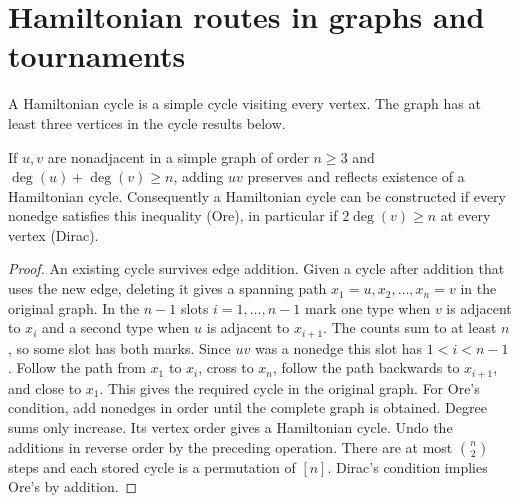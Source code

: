\section{Hamiltonian routes in graphs and tournaments}\label{co:hamilton}
A Hamiltonian cycle is a simple cycle visiting every vertex. The graph
has at least three vertices in the cycle results below.

\begin{theorem}\leavevmode\label{co:ore}
If $u,v$ are nonadjacent in a simple graph of order $n\ge3$ and
$\deg(u)+\deg(v)\ge n$, adding $uv$ preserves and reflects existence
of a Hamiltonian cycle. Consequently a Hamiltonian cycle can be
constructed if every nonedge satisfies this inequality (Ore), in
particular if $2\deg(v)\ge n$ at every vertex (Dirac).
\end{theorem}
\begin{proof}
An existing cycle survives edge addition. Given a cycle after addition
that uses the new edge, deleting it gives a spanning path
$x_1=u,x_2,\ldots,x_n=v$ in the original graph. In the $n-1$ slots
$i=1,\ldots,n-1$ mark one type when $v$ is adjacent to $x_i$ and
a second type when $u$ is adjacent to $x_{i+1}$. The counts sum to
at least $n$, so some slot has both marks. Since $uv$ was a nonedge
this slot has $1<i<n-1$. Follow the path from $x_1$ to $x_i$, cross
to $x_n$, follow the path backwards to $x_{i+1}$, and close to $x_1$.
This gives the required cycle in the original graph. For Ore's condition,
add nonedges in order until the complete graph is obtained. Degree sums
only increase. Its vertex order gives a Hamiltonian cycle. Undo the
additions in reverse order by the preceding operation. There are at most
$\binom n2$ steps and each stored cycle is a permutation of $[n]$.
Dirac's condition implies Ore's by addition.
\end{proof}

